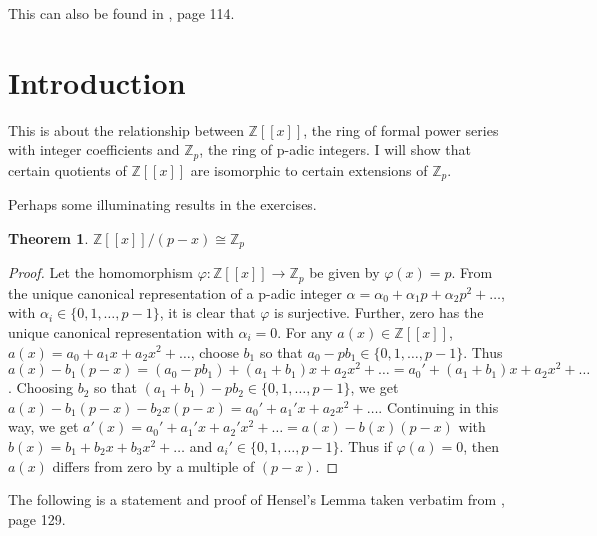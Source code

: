 \documentclass{article}
\newtheorem{theorem}{Theorem}
\begin{document}
This can also be found in \cite{MR1697859}, page 114.  

\section{Introduction}

This is about the relationship between $\mathbb{Z}[[x]]$, the ring of formal power series with integer coefficients and $\mathbb{Z}_p$, the ring of p-adic integers.  I will show that certain quotients of $\mathbb{Z}[[x]]$ are isomorphic to certain extensions of $\mathbb{Z}_p$.

Perhaps some illuminating results in the exercises.

\begin{theorem}\label{Z_p}
$\mathbb{Z}[[x]]/(p-x) \cong \mathbb{Z}_p$
\end{theorem}
\begin{proof}
Let the homomorphism $\varphi : \mathbb{Z}[[x]] \rightarrow \mathbb{Z}_p$ be given by $\varphi(x) = p$.  From the unique canonical representation of a p-adic integer $\alpha = \alpha_0 + \alpha_1 p  + \alpha_2 p^2 + \ldots$, with $\alpha_i \in \{0, 1, \ldots, p-1\}$, it is clear that $\varphi$ is surjective.  Further, zero has the unique canonical  representation with $\alpha_i = 0$.  For any $a(x) \in \mathbb{Z}[[x]]$, $a(x) = a_0 + a_1 x + a_2 x^2 + \ldots$, choose $b_1$ so that $a_0 - pb_1 \in \{0, 1, \ldots, p-1\}$.  Thus $a(x) - b_1(p-x) = (a_0 - pb_1) + (a_1 + b_1)x + a_2 x^2 + \ldots = a_0' + (a_1 + b_1)x + a_2 x^2 + \ldots$.  Choosing $b_2$ so that $(a_1 + b_1) - pb_2 \in \{0, 1, \ldots, p-1\}$, we get $a(x) - b_1(p-x) - b_2x(p-x) = a_0' + a_1'x + a_2 x^2 + \ldots$.  Continuing in this way, we get $a'(x)= a_0' + a_1'x + a_2' x^2 + \ldots = a(x) - b(x)(p-x)$ with $b(x) = b_1 + b_2x + b_3x^2 + \ldots$ and $a_i' \in \{0,1,\ldots,p-1\}$.  Thus if $\varphi(a) = 0$, then $a(x)$ differs from zero by a multiple of $(p-x)$.
\end{proof}

The following is a statement and proof of Hensel's Lemma taken verbatim from \cite{MR1697859}, page 129.
\end{document}
